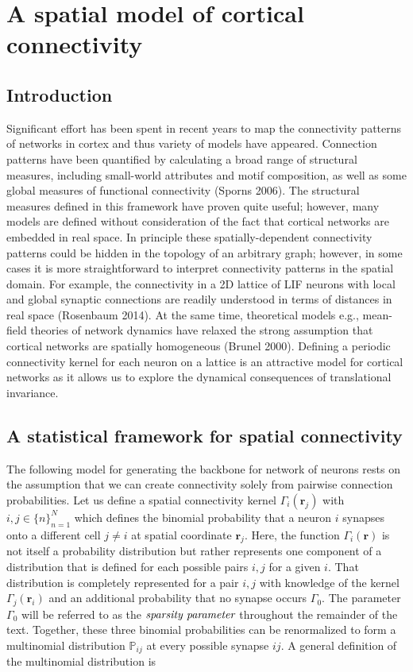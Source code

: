 \documentclass{ucetd}
\begin{document}
\chapter{A spatial model of cortical connectivity}

\section{Introduction}

Significant effort has been spent in recent years to map the connectivity patterns of networks in cortex and thus variety of models have appeared. Connection patterns have been quantified by calculating a broad range of structural measures, including small-world attributes and motif composition, as well as some global measures of functional connectivity (Sporns 2006). The structural measures defined in this framework have proven quite useful; however, many models are defined without consideration of the fact that cortical networks are embedded in real space. In principle these spatially-dependent connectivity patterns could be hidden in the topology of an arbitrary graph; however, in some cases it is more straightforward to interpret connectivity patterns in the spatial domain. For example, the connectivity in a 2D lattice of LIF neurons with local and global synaptic connections are readily understood in terms of distances in real space (Rosenbaum 2014). At the same time, theoretical models e.g., mean-field theories of network dynamics have relaxed the strong assumption that cortical networks are spatially homogeneous (Brunel 2000). Defining a periodic connectivity kernel for each neuron on a lattice is an attractive model for cortical networks as it allows us to explore the dynamical consequences of translational invariance.



\section{A statistical framework for spatial connectivity}

The following model for generating the backbone for network of neurons rests on the assumption that we can create connectivity solely from pairwise connection probabilities. Let us define a spatial connectivity kernel $\Gamma_{i}(\mathbf{r}_{j})$ with $i,j\in \{n\}_{n=1}^{N}$ which defines the binomial probability that a neuron $i$ synapses onto a different cell $j\neq i$ at spatial coordinate $\mathbf{r}_{j}$. Here, the function $\Gamma_{i}(\mathbf{r})$ is not itself a probability distribution but rather represents one component of a distribution that is defined for each possible pairs $i,j$ for a given $i$. That distribution is completely represented for a pair $i,j$ with knowledge of the kernel $\Gamma_{j}(\mathbf{r}_{i})$ and an additional probability that no synapse occurs $\Gamma_{0}$. The parameter $\Gamma_{0}$ will be referred to as the $\emph{sparsity parameter}$ throughout the remainder of the text. Together, these three binomial probabilities can be renormalized to form a multinomial distribution $\mathbb{P}_{ij}$ at every possible synapse $ij$. A general definition of the multinomial distribution is
\end{document}
